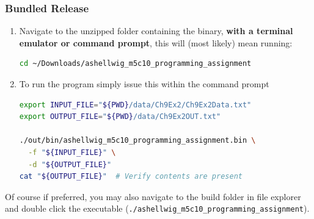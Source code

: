 \documentclass[a4paper, 11pt]{article}
\theoremstyle{definition}
\theoremstyle{plain}
\begin{document}
      \subsubsection{Bundled Release}
        \begin{enumerate}
          \item Navigate to the unzipped folder containing the binary,
            \textbf{with a terminal emulator or command prompt}, this will
            (most likely) mean running:
            \begin{lstlisting}[language=bash]
cd ~/Downloads/ashellwig_m5c10_programming_assignment
            \end{lstlisting}
          \item To run the program simply issue this within the command
            prompt
            \begin{lstlisting}[language=bash]
export INPUT_FILE="${PWD}/data/Ch9Ex2/Ch9Ex2Data.txt"
export OUTPUT_FILE="${PWD}/data/Ch9Ex2OUT.txt"

./out/bin/ashellwig_m5c10_programming_assignment.bin \
  -f "${INPUT_FILE}" \
  -d "${OUTPUT_FILE}"
cat "${OUTPUT_FILE}"  # Verify contents are present
            \end{lstlisting}
        \end{enumerate}
        Of course if preferred, you may also navigate to the build folder in
          file explorer and double click the executable
          (\texttt{./ashellwig\_m5c10\_programming\_assignment}).


  \newpage
  \nocite{*}
  \printbibliography[%
    heading=bibintoc,%
    title={Works Consulted},%
    category={consulted}%
  ]{}

  \appendix
  \newpage
\end{document}
